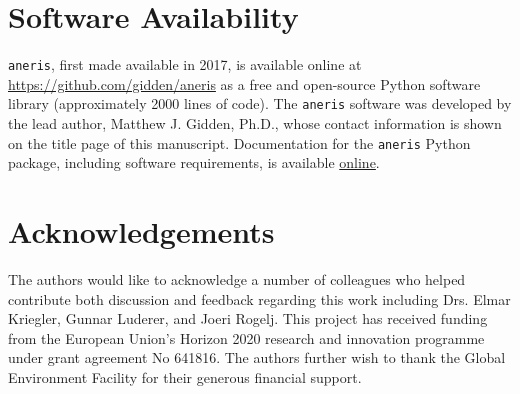 \documentclass[review]{elsarticle}
\begin{document}
 
\newpage
\section*{Software Availability}

\texttt{aneris}, first made available in 2017, is available online at
\url{https://github.com/gidden/aneris} as a free and open-source Python software
library (approximately 2000 lines of code). The \texttt{aneris} software was
developed by the lead author, Matthew J. Gidden, Ph.D., whose contact
information is shown on the title page of this manuscript. Documentation for the
\texttt{aneris} Python package, including software requirements, is available
\href{http://mattgidden.com/aneris/}{online}.

\newpage




% 
% 
% 


\section*{Acknowledgements}

The authors would like to acknowledge a number of colleagues who helped
contribute both discussion and feedback regarding this work including Drs. Elmar
Kriegler, Gunnar Luderer, and Joeri Rogelj. This project has received funding
from the European Union’s Horizon 2020 research and innovation programme under
grant agreement No 641816. The authors further wish to thank the Global
Environment Facility for their generous financial support.

\newpage
\section*{\refname}

\end{document}
